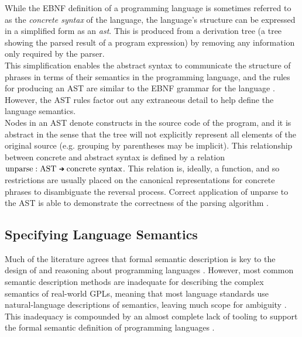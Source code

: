 While the EBNF definition of a programming language is sometimes referred to as the \textit{concrete syntax} of the language, the language's structure can be expressed in a simplified form as an \textit{\gls{ast}}.
This is produced from a derivation tree (a tree showing the parsed result of a program expression) by removing any information only required by the parser.\\

This simplification enables the abstract syntax to communicate the structure of phrases in terms of their semantics in the programming language, and the rules for producing an AST are similar to the EBNF grammar for the language \citep{slonneger1995formal}.
However, the AST rules factor out any extraneous detail to help define the language semantics. \\

Nodes in an AST denote constructs in the source code of the program, and it is abstract in the sense that the tree will not explicitly represent all elements of the original source (e.g. grouping by parentheses may be implicit). 
This relationship between concrete and abstract syntax is defined by a relation $\text{unparse} : \text{AST} \mathgoesto \text{concrete syntax}$.
This relation is, ideally, a function, and so restrictions are usually placed on the canonical representations for concrete phrases to disambiguate the reversal process. 
Correct application of unparse to the AST is able to demonstrate the correctness of the parsing algorithm \citep[pg. 29]{slonneger1995formal}.



\subsection{Specifying Language Semantics} %
\label{sub:specifying_language_semantics}

Much of the literature agrees that formal semantic description is key to the design of and reasoning about programming languages \citep{Zhang:2004:SSD:981009.981013,mosses1986use,Binsbergen:2016:TSC:2892664.2893464}.
However, most common semantic description methods are inadequate for describing the complex semantics of real-world GPLs, meaning that most language standards use natural-language descriptions of semantics, leaving much scope for ambiguity \citep{mosses1986use}.
This inadequacy is compounded by an almost complete lack of tooling to support the formal semantic definition of programming languages \citep{Binsbergen:2016:TSC:2892664.2893464}.\\


